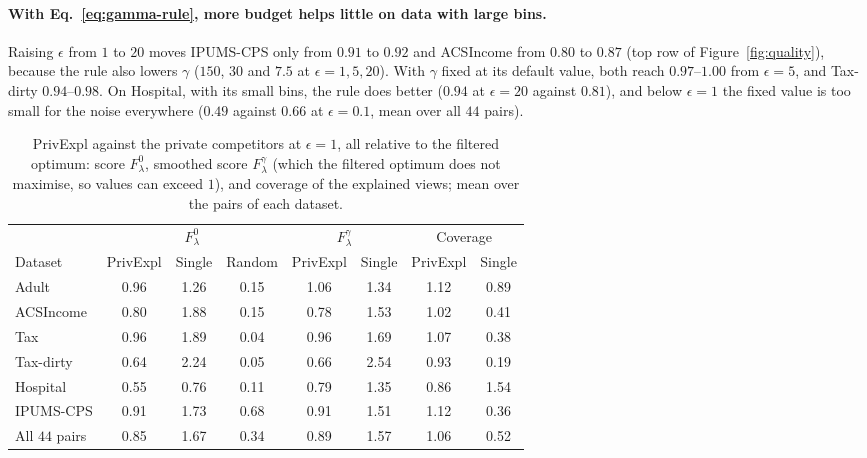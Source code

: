 \paragraph{With Eq.~\eqref{eq:gamma-rule}, more budget helps little on data with large bins.}
Raising $\epsilon$ from $1$ to $20$ moves IPUMS-CPS only from $0.91$ to $0.92$ and ACSIncome from $0.80$ to $0.87$ (top row of Figure~\ref{fig:quality}), because the rule also lowers $\gamma$ ($150$, $30$ and $7.5$ at $\epsilon=1,5,20$).
With $\gamma$ fixed at its default value, both reach $0.97$--$1.00$ from $\epsilon=5$, and Tax-dirty $0.94$--$0.98$.
On Hospital, with its small bins, the rule does better ($0.94$ at $\epsilon=20$ against $0.81$), and below $\epsilon=1$ the fixed value is too small for the noise everywhere ($0.49$ against $0.66$ at $\epsilon=0.1$, mean over all $44$ pairs).

\begin{table}[t]
\centering
\footnotesize
\caption{\textsf{PrivExpl} against the private competitors at $\epsilon=1$, all relative to the filtered optimum: score $F^0_\lambda$, smoothed score $F^\gamma_\lambda$ (which the filtered optimum does not maximise, so values can exceed $1$), and coverage of the explained views; mean over the pairs of each dataset.}
\label{tab:competitors}
\setlength{\tabcolsep}{2.5pt}
\begin{tabular}{@{}lccccccc@{}}
\toprule
 & \multicolumn{3}{c}{$F^0_\lambda$} & \multicolumn{2}{c}{$F^\gamma_\lambda$} & \multicolumn{2}{c}{Coverage} \\
\cmidrule(lr){2-4}\cmidrule(lr){5-6}\cmidrule(l){7-8}
Dataset & PrivExpl & Single & Random & PrivExpl & Single & PrivExpl & Single \\
\midrule
Adult      & 0.96 & 1.26 & 0.15 & 1.06 & 1.34 & 1.12 & 0.89 \\
ACSIncome  & 0.80 & 1.88 & 0.15 & 0.78 & 1.53 & 1.02 & 0.41 \\
Tax        & 0.96 & 1.89 & 0.04 & 0.96 & 1.69 & 1.07 & 0.38 \\
Tax-dirty  & 0.64 & 2.24 & 0.05 & 0.66 & 2.54 & 0.93 & 0.19 \\
Hospital   & 0.55 & 0.76 & 0.11 & 0.79 & 1.35 & 0.86 & 1.54 \\
IPUMS-CPS  & 0.91 & 1.73 & 0.68 & 0.91 & 1.51 & 1.12 & 0.36 \\
\midrule
All $44$ pairs & 0.85 & 1.67 & 0.34 & 0.89 & 1.57 & 1.06 & 0.52 \\
\bottomrule
\end{tabular}
\end{table}

